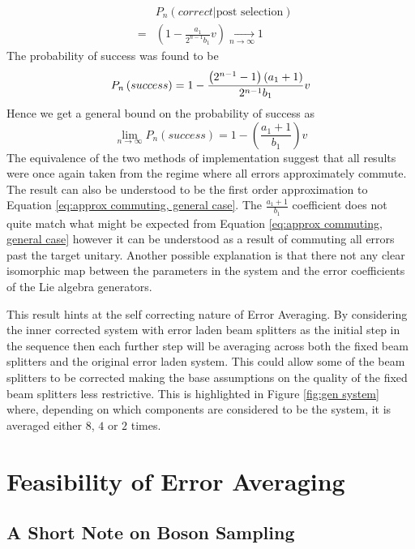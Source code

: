 \documentclass[aps,pra,twocolumn,superscriptaddress,numerical,floatfix]{revtex4-1}
\begin{document}
\begin{eqnarray}
&  & P_{n}\left(correct\left|\textrm{post selection}\right.\right)\nonumber \\
& = & \left(1-\frac{a_{1}}{2^{n-1}b_{1}}v\right)\xrightarrow[n\rightarrow\infty]{}1\label{eq:PcorrectGeneral}
\end{eqnarray}
The probability of success was found to be
\begin{equation}
P_{n}\left(success\right) =  1-\frac{\left(2^{n-1}-1\right)\left(a_{1}+1\right)}{2^{n-1}b_{1}}v\nonumber \\
\end{equation}
Hence we get a general bound on the probability of success as
\begin{equation}
\lim_{n\rightarrow\infty}P_{n}\left(success\right)=1-\left(\frac{a_{1}+1}{b_{1}}\right)v\label{eq:PsuccessGeneral}
\end{equation}
The equivalence of the two methods of implementation suggest that all results were once again taken from the regime where all errors approximately commute. The result can also be understood to be the first order approximation to Equation \ref{eq:approx commuting, general case}. The $\frac{a_1+1}{b_1}$ coefficient does not quite match what might be expected from Equation \ref{eq:approx commuting, general case} however it can be understood as a result of commuting all errors past the target unitary. Another possible explanation is that there not any clear isomorphic map between the parameters in the system and the error coefficients of the Lie algebra generators.

This result hints at the self correcting nature of Error Averaging. By considering the inner corrected system with error laden beam splitters as the initial step in the sequence then each further step will be averaging across both the fixed beam splitters and the original error laden system. This could allow some of the beam splitters to be corrected  making the base assumptions on the quality of the fixed beam splitters less restrictive. This is highlighted in Figure \ref{fig:gen system} where, depending on which components are considered to be the system, it is averaged either $8$, $4$ or $2$ times. 

\section{Feasibility of Error Averaging\label{Feasibility section}}

\subsection{A Short Note on Boson Sampling\label{Boson Sampling}}
\end{document}
